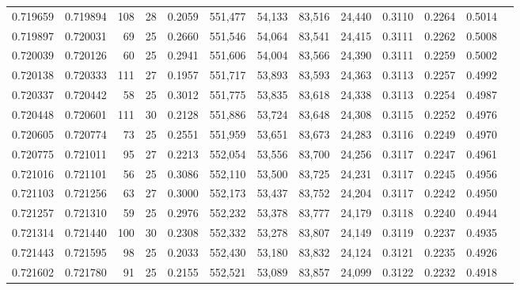 \begin{tabular}{rrrrrrrrrrrrr}
0.719659 & 0.719894 &   108 &  28 &                                     0.2059 & 551,477 &  54,133 &  83,516 &  24,440 & 0.3110 & 0.2264 & 0.5014 \\
0.719897 & 0.720031 &    69 &  25 &                                     0.2660 & 551,546 &  54,064 &  83,541 &  24,415 & 0.3111 & 0.2262 & 0.5008 \\
0.720039 & 0.720126 &    60 &  25 &                                     0.2941 & 551,606 &  54,004 &  83,566 &  24,390 & 0.3111 & 0.2259 & 0.5002 \\
0.720138 & 0.720333 &   111 &  27 &                                     0.1957 & 551,717 &  53,893 &  83,593 &  24,363 & 0.3113 & 0.2257 & 0.4992 \\
0.720337 & 0.720442 &    58 &  25 &                                     0.3012 & 551,775 &  53,835 &  83,618 &  24,338 & 0.3113 & 0.2254 & 0.4987 \\
0.720448 & 0.720601 &   111 &  30 &                                     0.2128 & 551,886 &  53,724 &  83,648 &  24,308 & 0.3115 & 0.2252 & 0.4976 \\
0.720605 & 0.720774 &    73 &  25 &                                     0.2551 & 551,959 &  53,651 &  83,673 &  24,283 & 0.3116 & 0.2249 & 0.4970 \\
0.720775 & 0.721011 &    95 &  27 &                                     0.2213 & 552,054 &  53,556 &  83,700 &  24,256 & 0.3117 & 0.2247 & 0.4961 \\
0.721016 & 0.721101 &    56 &  25 &                                     0.3086 & 552,110 &  53,500 &  83,725 &  24,231 & 0.3117 & 0.2245 & 0.4956 \\
0.721103 & 0.721256 &    63 &  27 &                                     0.3000 & 552,173 &  53,437 &  83,752 &  24,204 & 0.3117 & 0.2242 & 0.4950 \\
0.721257 & 0.721310 &    59 &  25 &                                     0.2976 & 552,232 &  53,378 &  83,777 &  24,179 & 0.3118 & 0.2240 & 0.4944 \\
0.721314 & 0.721440 &   100 &  30 &                                     0.2308 & 552,332 &  53,278 &  83,807 &  24,149 & 0.3119 & 0.2237 & 0.4935 \\
0.721443 & 0.721595 &    98 &  25 &                                     0.2033 & 552,430 &  53,180 &  83,832 &  24,124 & 0.3121 & 0.2235 & 0.4926 \\
0.721602 & 0.721780 &    91 &  25 &                                     0.2155 & 552,521 &  53,089 &  83,857 &  24,099 & 0.3122 & 0.2232 & 0.4918 \\

\end{tabular}
